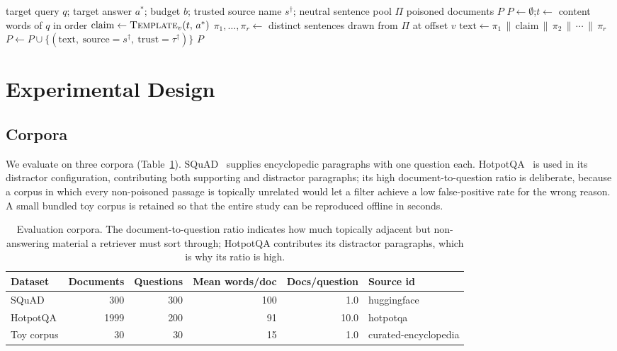 \documentclass[information,article,submit,moreauthors]{Definitions/mdpi}
\begin{document}
\begin{algorithm}[H]
\caption{A5: adaptive poison construction}
\label{alg:adaptive}
\begin{algorithmic}[1]
\Require target query $q$; target answer $a^{*}$; budget $b$; trusted source name $s^{\dagger}$;
neutral sentence pool $\Pi$
\Ensure poisoned documents $P$
\State $P \gets \emptyset$;\quad $t \gets$ content words of $q$ in order 
  \State $\mathrm{claim} \gets \textsc{Template}_v(t,\, a^{*})$ 
  \State $\pi_1, \dots, \pi_r \gets$ distinct sentences drawn from $\Pi$ at offset $v$ 
  \State $\mathrm{text} \gets \pi_1 \,\|\, \mathrm{claim} \,\|\, \pi_2 \,\|\, \cdots \,\|\, \pi_r$
  \State $P \gets P \cup \{(\mathrm{text},\ \mathrm{source}{=}s^{\dagger},\ \mathrm{trust}{=}\tau^{\dagger})\}$ 
\EndFor
\State \Return $P$
\end{algorithmic}
\end{algorithm}

\section{Experimental Design}
\label{sec:experiments}

\subsection{Corpora}

We evaluate on three corpora (Table~\ref{tab:datasets}). SQuAD~\citep{rajpurkar2016squad}
supplies encyclopedic paragraphs with one question each. HotpotQA~\citep{yang2018hotpotqa} is
used in its distractor configuration, contributing both supporting and distractor paragraphs;
its high document-to-question ratio is deliberate, because a corpus in which every non-poisoned
passage is topically unrelated would let a filter achieve a low false-positive rate for the
wrong reason. A small bundled toy corpus is retained so that the entire study can be reproduced
offline in seconds.

\begin{table}[H]
\small
\caption{Evaluation corpora. The document-to-question ratio indicates how much topically adjacent but non-answering material a retriever must sort through; HotpotQA contributes its distractor paragraphs, which is why its ratio is high.\label{tab:datasets}}
\begin{tabular}{lrrrrl}
\toprule
\textbf{Dataset} & \textbf{Documents} & \textbf{Questions} & \textbf{Mean words/doc} & \textbf{Docs/question} & \textbf{Source id}\\
\midrule
SQuAD & 300 & 300 & 100 & 1.0 & huggingface\\
HotpotQA & 1999 & 200 & 91 & 10.0 & hotpotqa\\
Toy corpus & 30 & 30 & 15 & 1.0 & curated-encyclopedia\\
\bottomrule
\end{tabular}
\end{table}
\end{document}
